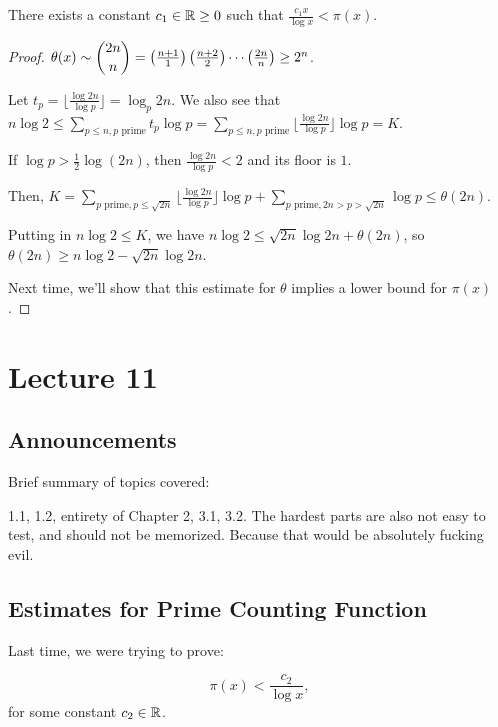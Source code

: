 \documentclass{article}
\begin{document}
\begin{proposition}
    There exists a constant $c_1 \in \mathbb R \geq 0$ such that $\frac{c_1 x}{\log x} < \pi(x)$.
\end{proposition}

\begin{proof}
    $\theta(x) \sim \dbinom{2n}{n} = \left(\frac{n+1}{1} \right)\left(\frac{n+2}{2} \right)\cdots\left(\frac{2n}{n} \right) \geq 2^n$.

    Let $t_p = \lfloor \frac{\log 2n}{\log p} \rfloor = \log_p 2n.$
    We also see that $n \log 2 \leq \sum_{p \leq n, p \text{ prime}} t_p \log p = \sum_{p \leq n, p \text{ prime}} \lfloor \frac{\log 2n}{\log p} \rfloor \log p = K$.

    If $\log p > \frac{1}{2} \log (2n)$, then $\frac{\log 2n}{\log p} < 2$ and its floor is $1$.

    Then, $K = \sum_{p \text{ prime}, p \leq \sqrt{2n}} \lfloor \frac{\log 2n}{\log p}\rfloor \log p + \sum_{p\text{ prime}, 2n > p > \sqrt{2n}} \log p \leq \theta(2n)$.

    Putting in $n \log 2 \leq K$, we have $n \log 2 \leq \sqrt{2n}\log 2n + \theta(2n)$, so $\theta(2n) \geq n \log 2 - \sqrt{2n} \log 2n$.

    Next time, we'll show that this estimate for $\theta$ implies a lower bound for $\pi(x)$.
\end{proof}

\section{Lecture 11}
\subsection{Announcements}
\label{sec.11.1}
Brief summary of topics covered:

1.1, 1.2, entirety of Chapter 2, 3.1, 3.2. The hardest parts are also not easy to test, and should not be memorized. Because that would be absolutely fucking evil.

\subsection{Estimates for Prime Counting Function}
Last time, we were trying to prove:
\begin{theorem}
    \[\pi(x) < \frac{c_2}{\log x}, \] for some constant $c_2 \in \mathbb R$. 
\end{theorem} 
\end{document}

